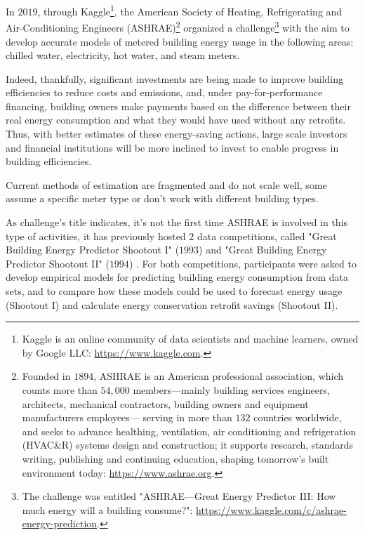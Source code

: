 \documentclass[twocolumn, switch]{article}
\begin{document}
In $2019$, through Kaggle\footnote{Kaggle is an online community of data scientists and machine learners, owned by Google LLC: \url{https://www.kaggle.com}.}, the American Society of Heating, Refrigerating and Air-Conditioning Engineers (ASHRAE)\footnote{Founded in $1894$, ASHRAE is an American professional association, which counts more than $54,000$ members---mainly building services engineers, architects, mechanical contractors, building owners and equipment manufacturers employees--- serving in more than $132$ countries worldwide, and seeks to advance healthing, ventilation, air conditioning and refrigeration (HVAC\&R) systems design and construction; it supports research, standards writing, publishing and continuing education, shaping tomorrow’s built environment today: \url{https://www.ashrae.org}.} organized a challenge\footnote{The challenge was entitled "ASHRAE---Great Energy Predictor III: How much energy will a building consume?": \url{https://www.kaggle.com/c/ashrae-energy-prediction}.} with the aim to develop accurate models of metered building energy usage in the following areas: chilled water, electricity, hot water, and steam meters.

Indeed, thankfully, significant investments are being made to improve building efficiencies to reduce costs and emissions, and, under pay-for-performance financing, building owners make payments based on the difference between their real energy consumption and what they would have used without any retrofits. Thus, with better estimates of these energy-saving actions, large scale investors and financial institutions will be more inclined to invest to enable progress in building efficiencies.

Current methods of estimation are fragmented and do not scale well, some assume a specific meter type or don’t work with different building types.

As challenge's title indicates, it's not the first time ASHRAE is involved in this type of activities, it has previously hosted $2$ data competitions, called "Great Building Energy Predictor Shootout I" ($1993$) \cite{Kreider_1994} and "Great Building Energy Predictor Shootout II" ($1994$) \cite{Haberl_1998}. For both competitions, participants were asked to develop empirical models for predicting building energy consumption from data sets, and to compare how these models could be used to forecast energy usage (Shootout I) and calculate energy conservation retrofit savings (Shootout II).
\end{document}

